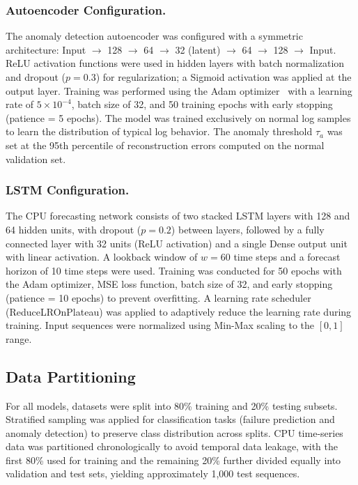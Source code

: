\documentclass[sn-nature]{sn-jnl}
\theoremstyle{thmstyleone}
\theoremstyle{thmstyletwo}
\theoremstyle{thmstylethree}
\begin{document}
\subsubsection{Autoencoder Configuration.}
The anomaly detection autoencoder was configured with a symmetric architecture: Input $\rightarrow$ 128 $\rightarrow$ 64 $\rightarrow$ 32 (latent) $\rightarrow$ 64 $\rightarrow$ 128 $\rightarrow$ Input. ReLU activation functions were used in hidden layers with batch normalization and dropout ($p=0.3$) for regularization; a Sigmoid activation was applied at the output layer. Training was performed using the Adam optimizer~\cite{kingma2015adam} with a learning rate of $5 \times 10^{-4}$, batch size of 32, and 50 training epochs with early stopping (patience = 5 epochs). The model was trained exclusively on normal log samples to learn the distribution of typical log behavior. The anomaly threshold $\tau_a$ was set at the 95th percentile of reconstruction errors computed on the normal validation set.

\subsubsection{LSTM Configuration.}
The CPU forecasting network consists of two stacked LSTM layers with 128 and 64 hidden units, with dropout ($p=0.2$) between layers, followed by a fully connected layer with 32 units (ReLU activation) and a single Dense output unit with linear activation. A lookback window of $w = 60$ time steps and a forecast horizon of 10 time steps were used. Training was conducted for 50 epochs with the Adam optimizer, MSE loss function, batch size of 32, and early stopping (patience = 10 epochs) to prevent overfitting. A learning rate scheduler (ReduceLROnPlateau) was applied to adaptively reduce the learning rate during training. Input sequences were normalized using Min-Max scaling to the $[0, 1]$ range.

\subsection{Data Partitioning}\label{subsec:partition}

For all models, datasets were split into 80\% training and 20\% testing subsets. Stratified sampling was applied for classification tasks (failure prediction and anomaly detection) to preserve class distribution across splits. CPU time-series data was partitioned chronologically to avoid temporal data leakage, with the first 80\% used for training and the remaining 20\% further divided equally into validation and test sets, yielding approximately 1,000 test sequences.
\end{document}
